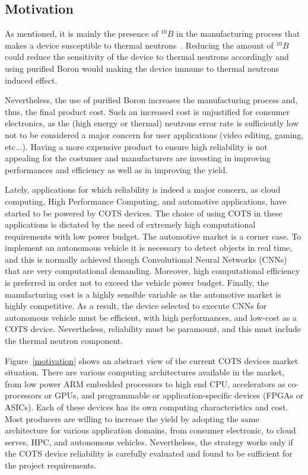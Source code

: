 \subsection{Motivation}
\label{sec_mot}

As mentioned, it is mainly the presence of $^{10}B$ in the manufacturing process that makes a device susceptible to thermal neutrons~\cite{wen2010b10}. Reducing the amount of $^{10}B$ could reduce the sensitivity of the device to thermal neutrons accordingly and using purified Boron would making the device immune to thermal neutrons induced effect.

Nevertheless, the use of purified Boron increases the manufacturing process and, thus, the final product cost. Such an increased cost is unjustified for consumer electronics, as the (high energy or thermal) neutrons error rate is sufficiently low not to be considered a major concern for user applications (video editing, gaming, etc...). Having a more expensive product to ensure high reliability is not appealing for the costumer and manufacturers are investing in improving performances and efficiency as well as in improving the yield. 

Lately, applications for which reliability is indeed a major concern, as cloud computing, High Performance Computing, and automotive applications, have started to be powered by COTS devices. The choice of using COTS in these applications is dictated by the need of extremely high computational requirements with low power budget. The automotive market is a corner case. To implement an autonomous vehicle it is necessary to detect objects in real time, and this is normally achieved though Convolutional Neural Networks (CNNs) that are very computational demanding. Moreover, high computational efficiency is preferred in order not to exceed the vehicle power budget. Finally, the manufacturing cost is a highly sensible variable as the automotive market is highly competitive. As a result, the device selected to execute CNNs for autonomous vehicle must be efficient, with high performances, and low-cost as a COTS device. Nevertheless, reliability must be paramount, and this must include the thermal neutron component.

Figure~\ref{motivation} shows an abstract view of the current COTS devices market situation. There are various computing architectures available in the market, from low power ARM embedded processors to high end CPU, accelerators as co-processors or GPUs, and programmable or application-specific devices (FPGAs or ASICs). Each of these devices has its own computing characteristics and cost. Most producers are willing to increase the yield by adopting the same architecture for various application domains, from consumer electronic, to cloud serves, HPC, and autonomous vehicles. Nevertheless, the strategy works only if the COTS device reliability is carefully evaluated and found to be sufficient for the project requirements. 

